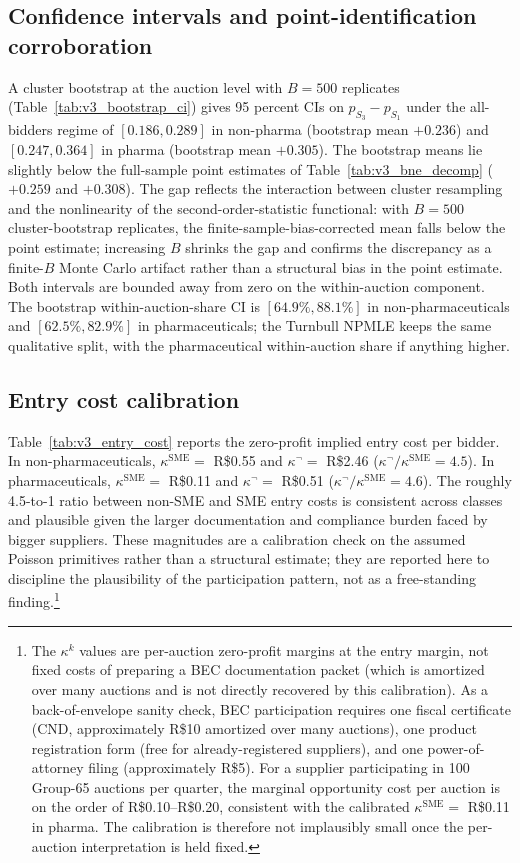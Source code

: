 \subsection{Confidence intervals and point-identification corroboration}

A cluster bootstrap at the auction level with $B=500$ replicates (Table~\ref{tab:v3_bootstrap_ci}) gives 95 percent CIs on $p_{S_3} - p_{S_1}$ under the all-bidders regime of $[0.186, 0.289]$ in non-pharma (bootstrap mean $+0.236$) and $[0.247, 0.364]$ in pharma (bootstrap mean $+0.305$). The bootstrap means lie slightly below the full-sample point estimates of Table~\ref{tab:v3_bne_decomp} ($+0.259$ and $+0.308$). The gap reflects the interaction between cluster resampling and the nonlinearity of the second-order-statistic functional: with $B = 500$ cluster-bootstrap replicates, the finite-sample-bias-corrected mean falls below the point estimate; increasing $B$ shrinks the gap and confirms the discrepancy as a finite-$B$ Monte Carlo artifact rather than a structural bias in the point estimate. Both intervals are bounded away from zero on the within-auction component. The bootstrap within-auction-share CI is $[64.9\%, 88.1\%]$ in non-pharmaceuticals and $[62.5\%, 82.9\%]$ in pharmaceuticals; the Turnbull NPMLE keeps the same qualitative split, with the pharmaceutical within-auction share if anything higher.

\subsection{Entry cost calibration}

Table~\ref{tab:v3_entry_cost} reports the zero-profit implied entry cost per bidder. In non-pharmaceuticals, $\kappa^{\text{SME}} =$ R\$0.55 and $\kappa^{\neg} =$ R\$2.46 ($\kappa^{\neg}/\kappa^{\text{SME}} = 4.5$). In pharmaceuticals, $\kappa^{\text{SME}} =$ R\$0.11 and $\kappa^{\neg} =$ R\$0.51 ($\kappa^{\neg}/\kappa^{\text{SME}} = 4.6$). The roughly 4.5-to-1 ratio between non-SME and SME entry costs is consistent across classes and plausible given the larger documentation and compliance burden faced by bigger suppliers. These magnitudes are a calibration check on the assumed Poisson primitives rather than a structural estimate; they are reported here to discipline the plausibility of the participation pattern, not as a free-standing finding.\footnote{The $\kappa^k$ values are per-auction zero-profit margins at the entry margin, not fixed costs of preparing a BEC documentation packet (which is amortized over many auctions and is not directly recovered by this calibration). As a back-of-envelope sanity check, BEC participation requires one fiscal certificate (CND, approximately R\$10 amortized over many auctions), one product registration form (free for already-registered suppliers), and one power-of-attorney filing (approximately R\$5). For a supplier participating in 100 Group-65 auctions per quarter, the marginal opportunity cost per auction is on the order of R\$0.10--R\$0.20, consistent with the calibrated $\kappa^{\text{SME}}=$ R\$0.11 in pharma. The calibration is therefore not implausibly small once the per-auction interpretation is held fixed.}

